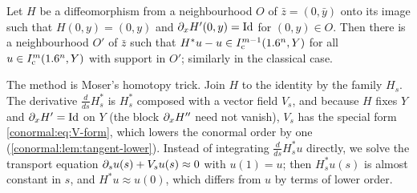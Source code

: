 \begin{proposition}\label{conormal:prop:moser}
  Let $H$ be a diffeomorphism from a neighbourhood $O$ of $\bar z=(0,\bar y)$
  onto its image such that $H(0,y)=(0,y)$ and $\partial_xH'(0,y)=\operatorname{Id}$ for
  $(0,y)\in O$.  Then there is a neighbourhood $O'$ of $\bar z$ such that
  $H^*u-u\in I^{m-1}_{\mathrm c}(1.6^n,Y)$ for all
  $u\in I^{m}_{\mathrm c}(1.6^n,Y)$ with support in $O'$; similarly in the
  classical case.
\end{proposition}
\begin{discussion}
  The method is Moser's homotopy trick. Join $H$ to the identity by the family
  $H_s$. The derivative $\frac d{ds}H_s^*$ is $H_s^*$ composed with a vector field
  $V_s$, and because $H$ fixes $Y$ and $\partial_xH'=\operatorname{Id}$ on $Y$ (the block
  $\partial_xH''$ need not vanish), $V_s$ has the special form \eqref{conormal:eq:V-form}, which lowers the conormal
  order by one (\cref{conormal:lem:tangent-lower}). Instead of integrating
  $\frac d{ds}H_s^*u$ directly, we solve the transport equation
  $\partial_su(s)+V_su(s)\approx0$ with $u(1)=u$; then $H_s^*u(s)$ is almost constant
  in $s$, and $H^*u\approx u(0)$, which differs from $u$ by terms of lower
  order.
\end{discussion}

